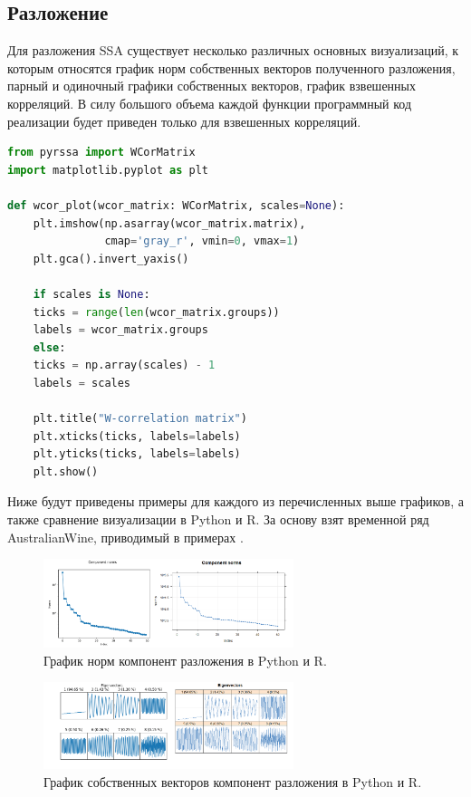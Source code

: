 \documentclass[specialist,
			   substylefile = spbu_report.rtx,
			   subf,href,colorlinks=true, 12pt]{disser}
\begin{document}
\subsection{Разложение}

Для разложения SSA существует несколько различных основных визуализаций, к которым относятся график норм собственных векторов полученного разложения, парный и одиночный графики собственных векторов, график взвешенных корреляций. В силу большого объема каждой функции программный код реализации будет приведен только для взвешенных корреляций.

\noindent
\begin{minipage}{\linewidth}
\begin{lstlisting}[language=Python, caption=Визуализация взвешенных корреляций с помощью matplotlib.]
from pyrssa import WCorMatrix	
import matplotlib.pyplot as plt
	
def wcor_plot(wcor_matrix: WCorMatrix, scales=None):
	plt.imshow(np.asarray(wcor_matrix.matrix), 
			   cmap='gray_r', vmin=0, vmax=1)
	plt.gca().invert_yaxis()
	
	if scales is None:
	ticks = range(len(wcor_matrix.groups))
	labels = wcor_matrix.groups
	else:
	ticks = np.array(scales) - 1
	labels = scales
	
	plt.title("W-correlation matrix")
	plt.xticks(ticks, labels=labels)
	plt.yticks(ticks, labels=labels)
	plt.show()
\end{lstlisting}
\end{minipage}

Ниже будут приведены примеры для каждого из перечисленных выше графиков, а также сравнение визуализации в Python и R. За основу взят временной ряд AustralianWine, приводимый в примерах \cite{rssa-book}. 


\begin{figure}[htp]
	\centering
	\includegraphics[width=0.65\textwidth]{rpy_norms}
	\caption{График норм компонент разложения в Python и R.}
	\label{fig:rpy_norms}
\end{figure}

\begin{figure}[htp]
	\centering
	\includegraphics[width=0.65\textwidth]{rpy_vectors}
	\caption{График собственных векторов компонент разложения в Python и R.}
	\label{fig:rpy_vectors}
\end{figure}
\end{document}
